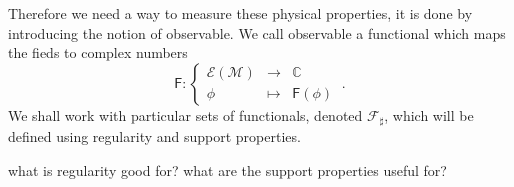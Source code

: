 \documentclass[10pt]{book}
\newcommand{\Ecal}{\mathcal{E}}
\newcommand{\Fcal}{\mathcal{F}}
\newcommand{\Mcal}{\mathcal{M}}
\newcommand{\Cbb}{\mathbb{C}}
\newcommand{\Fsf}{\mathsf{F}}
\theoremstyle{break}
\begin{document}
Therefore we need a way to measure these physical properties, it is done by introducing the notion of observable. We call observable a functional which maps the fieds to complex numbers%
%
\begin{equation*}
\Fsf : \left\{
\begin{array}{ccc}
\Ecal(\Mcal) & \to     & \Cbb \\
\phi  & \mapsto & \Fsf(\phi)
\end{array}
\right. \ .
\end{equation*}
%
We shall work with particular sets of functionals, denoted $\Fcal_\sharp$, which will be defined using regularity and support properties. \par%


what is regularity good for?  what are the support properties useful for? 


\bigskip
\end{document}
